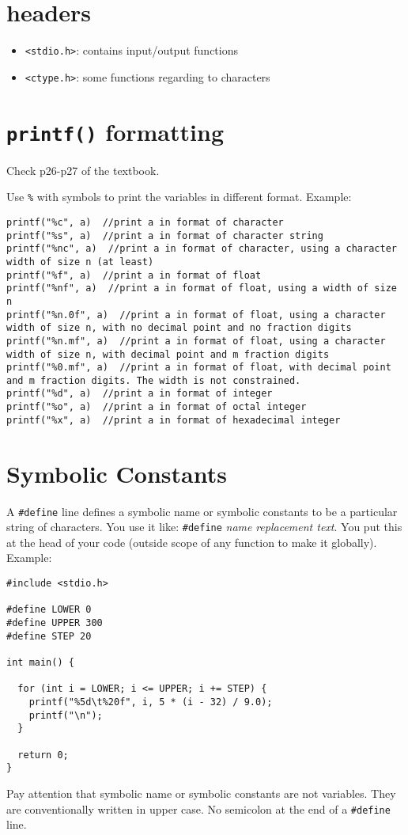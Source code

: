 \documentclass[12pt]{article}
\begin{document}
\section{headers}
\label{sec:orgfa82a67}
\begin{itemize}
\item \texttt{<stdio.h>}: contains input/output functions
\item \texttt{<ctype.h>}: some functions regarding to characters
\end{itemize}

\section{\texttt{printf()} formatting}
\label{sec:org1ec38e4}
Check p26-p27 of the textbook.

Use \texttt{\%} with symbols to print the variables in different format.
Example:
\begin{verbatim}
printf("%c", a)  //print a in format of character
printf("%s", a)  //print a in format of character string
printf("%nc", a)  //print a in format of character, using a character width of size n (at least)
printf("%f", a)  //print a in format of float
printf("%nf", a)  //print a in format of float, using a width of size n
printf("%n.0f", a)  //print a in format of float, using a character width of size n, with no decimal point and no fraction digits
printf("%n.mf", a)  //print a in format of float, using a character width of size n, with decimal point and m fraction digits
printf("%0.mf", a)  //print a in format of float, with decimal point and m fraction digits. The width is not constrained.
printf("%d", a)  //print a in format of integer
printf("%o", a)  //print a in format of octal integer
printf("%x", a)  //print a in format of hexadecimal integer
\end{verbatim}
\section{Symbolic Constants}
\label{sec:orgdd3ac23}
A \texttt{\#define} line defines a symbolic name or symbolic constants to be a particular string of characters. You use it like: \texttt{\#define} \emph{name} \emph{replacement text}. You put this at the head of your code (outside scope of any function to make it globally). Example:
\begin{verbatim}
#include <stdio.h>

#define LOWER 0
#define UPPER 300
#define STEP 20

int main() {

  for (int i = LOWER; i <= UPPER; i += STEP) {
    printf("%5d\t%20f", i, 5 * (i - 32) / 9.0);
    printf("\n");
  }

  return 0;
}
\end{verbatim}
Pay attention that symbolic name or symbolic constants are not variables. They are conventionally written in upper case. No semicolon at the end of a \texttt{\#define} line.
\end{document}
